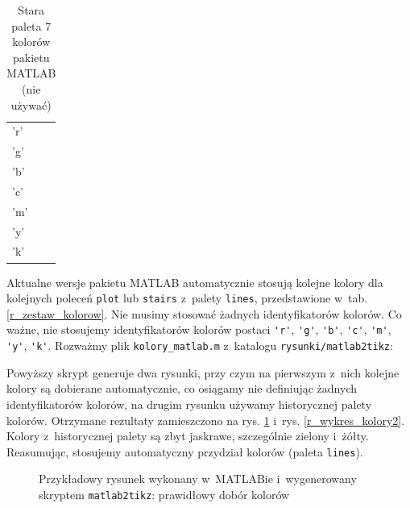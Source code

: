 
\begin{table}[H]
\caption{Stara paleta 7 kolorów pakietu MATLAB (nie używać)}
\label{r_zestaw_kolorow_MATLAB_historia}
	\centering
	\begin{small}
		\begin{tabular}{|p{3cm}|p{4cm}|}
			\hline
			'r' & \cellcolor{staryczerwony}\\
			'g' & \cellcolor{staryzielony}\\
			'b' & \cellcolor{staryniebieski}\\
			'c' & \cellcolor{staryjasnoniebieski}\\
			'm' & \cellcolor{staryfioletowy}\\
			'y' & \cellcolor{staryzolty}\\
			'k' & \cellcolor{czarny}\\
			\hline
		\end{tabular}
	\end{small}
\end{table}

Aktualne wersje pakietu MATLAB automatycznie stosują kolejne kolory dla kolejnych poleceń \verb+plot+ lub \verb+stairs+ z~palety \texttt{lines}, przedstawione w~tab. \ref{r_zestaw_kolorow}. Nie musimy stosować żadnych identyfikatorów kolorów. Co ważne, nie stosujemy identyfikatorów kolorów postaci \verb+'r'+, \verb+'g'+, \verb+'b'+, \verb+'c'+, \verb+'m'+, \verb+'y'+, \verb+'k'+. Rozważmy plik \verb+kolory_matlab.m+ z~katalogu \verb+rysunki/matlab2tikz+:

Powyższy skrypt generuje dwa rysunki, przy czym na pierwszym z~nich kolejne kolory są dobierane automatycznie, co osiągamy nie definiując żadnych identyfikatorów kolorów, na drugim rysunku używamy historycznej palety kolorów. Otrzymane rezultaty zamieszczono na rys. \ref{r_wykres_kolory1} i~rys. \ref{r_wykres_kolory2}. Kolory z~historycznej palety są zbyt jaskrawe, szczególnie zielony i~żółty. Reasumując, stosujemy automatyczny przydział kolorów (paleta \texttt{lines}).

\begin{figure}[H]
\centering
	
\caption{Przykładowy rysunek wykonany w~MATLABie i~wygenerowany skryptem \texttt{matlab2tikz}: prawidłowy dobór kolorów}
\label{r_wykres_kolory1}
\end{figure}

